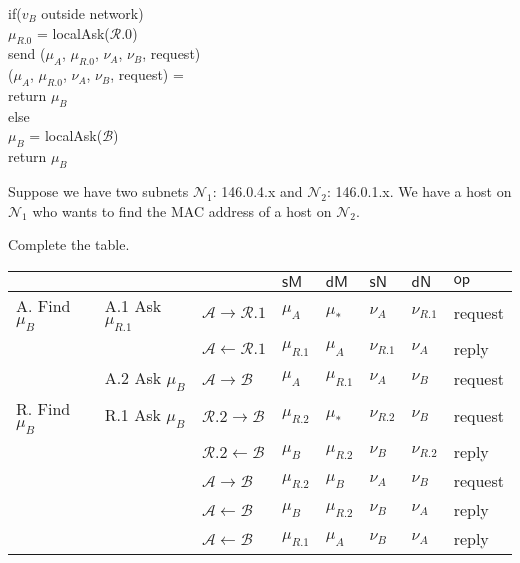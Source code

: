if($v_B$ outside network) \\
$\mu_{R.0}$ = localAsk($\mathcal{R}.0$) \\
send ($\mu_{A}$, $\mu_{R.0}$, $\nu_{A}$, $\nu_{B}$, \textsf{request})\\
($\mu_{A}$, $\mu_{R.0}$, $\nu_{A}$, $\nu_{B}$, \textsf{request}) = \\
return $\mu_{B}$\\
else \\
$\mu_{B}$ = localAsk($\mathcal{B}$) \\
return $\mu_{B}$\\

\frmrule 

\begin{example}
Suppose we have two subnets $\mathcal{N}_1$: 146.0.4.x and $\mathcal{N}_2$: 146.0.1.x. 
We have a host on $\mathcal{N}_1$ who wants to find the MAC address of a host 
on $\mathcal{N}_2$. 

Complete the table.
\begin{table}[h]
    \centering
    \begin{tabular}{ll|llllll}
    & &    & $\textsf{sM}$ & $\textsf{dM}$  & $\textsf{sN}$ & $\textsf{dN}$ & $\textsf{op}$ \\ \hline
    A. Find $\mu_B$& A.1 Ask $\mu_{R.1}$ & $\mathcal{A} \rightarrow \mathcal{R}.1$  & $\mu_{A}$ & $ \mu_{*} $ & $\nu_{A}$ & $\nu_{R.1}$ & \textsf{request}  \\
    & & $\mathcal{A} \leftarrow \mathcal{R}.1$   & $\mu_{R.1}$ & $\mu_{A}$ & $\nu_{R.1}$ & $\nu_{A}$ & \textsf{reply} \\ 
    & A.2 Ask $\mu_B$ & $\mathcal{A} \rightarrow \mathcal{B}$   & $\mu_{A}$ & $\mu_{R.1}$ & $\nu_{A}$ & $\nu_{B}$ & \textsf{request}  \\ \hline
    R. Find $\mu_B$ & R.1 Ask $\mu_B$ & $\mathcal{R}.2 \rightarrow \mathcal{B}$   & $\mu_{R.2}$ & $\mu_{*}$ & $\nu_{R.2}$ & $\nu_{B}$ & \textsf{request}  \\
    & & $\mathcal{R}.2 \leftarrow \mathcal{B}$   & $\mu_{B}$ & $\mu_{R.2}$ & $\nu_{B}$ & $\nu_{R.2}$ & \textsf{reply}  \\ \hline
    &  & $\mathcal{A} \rightarrow \mathcal{B}$   & $\mu_{R.2}$ & $\mu_{B}$ & $\nu_{A}$ & $\nu_{B}$ & \textsf{request}  \\ 
    &  & $\mathcal{A} \leftarrow \mathcal{B}$   & $\mu_{B}$ & $\mu_{R.2}$ & $\nu_{B}$ & $\nu_{A}$ & \textsf{reply}  \\
    &  & $\mathcal{A} \leftarrow \mathcal{B}$   & $\mu_{R.1}$ & $\mu_{A}$ & $\nu_{B}$ & $\nu_{A}$ & \textsf{reply}  \\
    \end{tabular}
\end{table}



\end{example}




